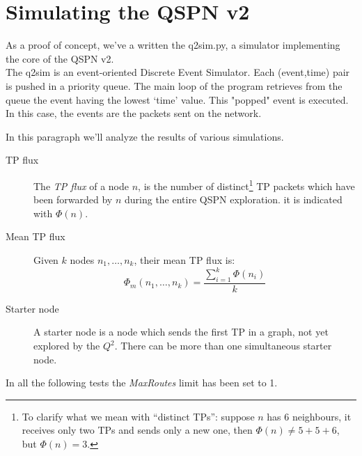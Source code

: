 \documentclass[a4paper]{article}
\begin{document}
\section{Simulating the QSPN v2}
As a proof of concept, we've a written the q2sim.py\cite{q2sim}, a simulator
implementing the core of the QSPN v2.\\
The q2sim is  an event-oriented Discrete Event Simulator.
Each (event,time) pair is pushed in a priority queue.
The main loop of the program retrieves from the queue the event having the
lowest `time' value. This "popped" event is executed. In this case, the
events are the packets sent on the network.

In this paragraph we'll analyze the results of various simulations.
\begin{description}
	\item[TP flux] The \emph{TP flux} of a node $n$, is the number of
		distinct\footnote{To clarify what we mean with ``distinct
		TPs'': suppose $n$ has $6$ neighbours, it receives only two
		TPs and sends only a new one, then $\Phi(n)\neq 5+5+6$, but
		$\Phi(n)=3$.}
		TP packets which have been forwarded by $n$ during the entire QSPN
		exploration. it is indicated with $\Phi(n)$.
	\item[Mean TP flux] Given $k$ nodes ${n_1,\dots,n_k}$, their mean TP
		flux is:
		\[
		\Phi_m({n_1,\dots,n_k})=\frac{\sum_{i=1}^{k}\Phi(n_i)}{k}
		\]
	\item[Starter node]
		A starter node is a node which sends the first TP in a graph,
		not yet explored by the $Q^2$. There can be more than one
		simultaneous starter node.
\end{description}
In all the following tests the \emph{MaxRoutes} limit has been set to 1.\\
\end{document}
